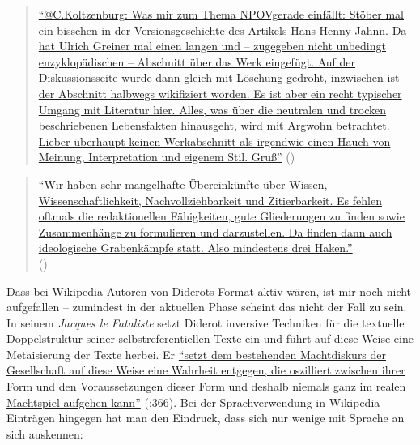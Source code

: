 \documentclass[fontsize=12pt]{scrartcl}
\begin{document}
\singlespacing
\begin{quote}
\href{https://de.wikipedia.org/w/index.php?title=Benutzer_Diskussion:Edith_Wahr\&diff=138430132\&oldid=138428015}{"`@C.Kolt\-zen\-burg: Was mir zum Thema \flq NPOV\frq gerade einf\"allt: St\"o\-ber mal ein bisschen in der Versionsgeschichte des Artikels Hans Henny Jahnn. Da hat Ulrich Greiner mal einen langen und -- zugegeben nicht un\-be\-dingt \flq enzyklop\"adischen\frq \,\,-- Abschnitt \"uber das Werk eingef\"ugt. Auf der Dis\-kus\-si\-onsseite wurde dann gleich mit L\"oschung gedroht, in\-zwi\-schen ist der Abschnitt halbwegs \flq wikifiziert\frq \,\,worden. Es ist aber ein recht ty\-pi\-scher Umgang mit Li\-te\-ra\-tur \mbox{hier}. Alles, was \"uber die neutralen und trocken beschriebenen Lebensfakten hinausgeht, wird mit Argwohn betrachtet. Lieber \"uberhaupt keinen Werkabschnitt als irgendwie einen Hauch von Meinung, Interpretation und eigenem Stil. Gru{\ss}"'} (\cite{UserMagiers2015c})
\end{quote}
\onehalfspacing

\singlespacing
\begin{quote}
\href{https://de.wikipedia.org/w/index.php?title=Benutzer_Diskussion:Simplicius&diff=next&oldid=136395255}{"`Wir haben sehr mangelhafte \"Ubereink\"unfte \"uber Wissen, Wissenschaft\-lich\-keit, Nachvollziehbarkeit und Zitierbarkeit. Es fehlen oftmals die re\-dak\-tio\-nel\-len F\"ahigkei\-ten, gute Gliederungen zu finden sowie Zusammenh\"ange zu formulieren und darzustellen. Da finden dann auch ideologische Grabenk\"am\-pfe statt. Also mindestens drei Haken."'}\\ (\cite{UserSimplicius2014b})
\end{quote}
\onehalfspacing 

Dass bei Wi\-ki\-pe\-dia Autoren\textsuperscript{\tiny *} von Diderots Format aktiv w\"aren, ist mir noch nicht aufgefallen -- zumindest in der aktuellen Phase scheint das nicht der Fall zu sein. In seinem \textit{Jacques le Fataliste} setzt Diderot inversive Techniken f\"ur die textuelle Doppelstruktur seiner selbst\-referentiellen Texte ein und f\"uhrt auf diese Weise eine Metaisierung der Texte herbei. Er \href{https://publikationen.uni-tuebingen.de/xmlui/handle/10900/47049}{"`setzt dem bestehenden Machtdiskurs der Ge\-sell\-schaft auf diese Weise eine Wahrheit entgegen, die oszilliert zwischen ihrer Form und den Voraussetzungen dieser Form und deshalb niemals ganz im realen Machtspiel aufgehen kann"'} (\cite{Lorenz2012}:366). Bei der Sprachverwendung in Wi\-ki\-pe\-dia-Eintr\"agen hingegen hat man den Eindruck, dass sich nur wenige mit Sprache an sich auskennen:
\end{document}
